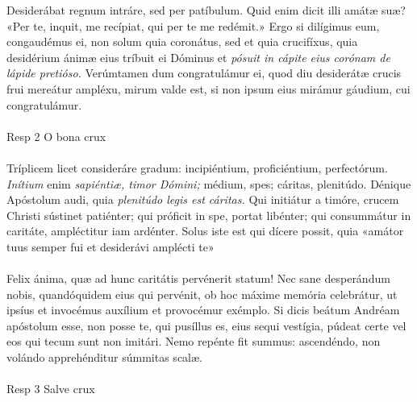 \documentclass[options]{article}
\begin{document}
Desiderábat regnum intráre, sed per patíbulum. Quid enim dicit illi amátæ suæ? «Per te, inquit, me recípiat, qui per te me redémit.» Ergo si dilígimus eum, congaudémus ei, non solum quia coronátus, sed et quia crucifíxus, quia desidérium ánimæ eius tríbuit ei Dóminus et \emph{pósuit in cápite eius corónam de lápide pretióso.} Verúmtamen dum congratulámur ei, quod diu desiderátæ crucis frui mereátur ampléxu, mirum valde est, si non ipsum eius mirámur gáudium, cui congratulámur.\\
\\
Resp 2 O bona crux\\
\\
Tríplicem licet consideráre gradum: incipiéntium, proficiéntium, perfectórum. \emph{Inítium} enim \emph{sapiéntiæ, timor Dómini;}  médium, spes; cáritas, plenitúdo. Dénique Apóstolum audi, quia \emph{plenitúdo legis est cáritas.} Qui initiátur a timóre, crucem Christi sústinet patiénter; qui próficit in spe, portat libénter; qui consummátur in caritáte, ampléctitur iam ardénter. Solus iste est qui dícere possit, quia «amátor tuus semper fui et desiderávi amplécti te»\\
\\
Felix ánima, quæ ad hunc caritátis pervénerit statum! Nec sane desperándum nobis, quandóquidem eius qui pervénit, ob hoc máxime memória celebrátur, ut ipsíus et invocémus auxílium et provocémur exémplo. Si dicis beátum Andréam apóstolum esse, non posse te, qui pusíllus es, eius sequi vestígia, púdeat certe vel eos qui tecum sunt non imitári. Nemo repénte fit summus: ascendéndo, non volándo apprehénditur súmmitas scalæ.\\
\\
Resp 3  Salve crux\\
\\
\end{document}
